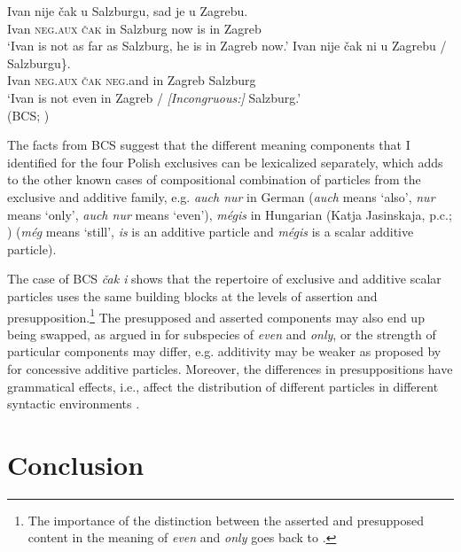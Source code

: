 \documentclass[output=paper,colorlinks,citecolor=brown]{langscibook}
\begin{document}
\ea\label{ex:tom:98}
\ea\label{ex:tom:98a} 
\gll Ivan nije čak u Salzburgu, sad je u Zagrebu.\\     
Ivan \textsc{neg.aux} \textsc{čak} in Salzburg now is in Zagreb\\
\glt `Ivan is not as far as Salzburg, he is in Zagreb now.’
\ex\label{ex:tom:98b}    
\gll Ivan nije čak ni u \minsp{\{} Zagrebu / \minsp{\#} Salzburgu\}.\\
Ivan \textsc{neg.aux} \textsc{čak} \textsc{neg}.and in {} Zagreb {} {} Salzburg\\
\glt `Ivan is not even in Zagreb / \textit{[Incongruous:]} Salzburg.’\\\hfill(BCS; \cite[(28--29)]{jasinskajatomaszewicz16})
\z 
\z 

\noindent The facts from BCS %
suggest that the different meaning components that I identified for the four Polish exclusives can be lexicalized separately, which adds to the other known cases of compositional combination of particles from the exclusive and additive family, e.g. \textit{auch nur} in German \citep{guerzoni03} (\textit{auch} means `also', \textit{nur} means `only', \textit{auch nur} means `even'), \textit{mégis} in Hungarian (Katja Jasinskaja, p.c.; \citealt{csirmazslade20}) (\textit{még} means `still', \textit{is} is an additive particle and \textit{mégis}  is a scalar additive particle).


The case of BCS \textit{čak i} shows that the repertoire of exclusive and additive scalar particles uses the same building blocks at the levels of assertion and presupposition.\footnote{The importance of the distinction between the asserted and presupposed content in the meaning of \textit{even} and \textit{only} goes back to \citealt{horn69}.} The presupposed and asserted components may also end up being swapped, as argued in \citet{guerzoni03} for subspecies of \textit{even} and \textit{only}, or the strength of particular components may differ, e.g. additivity may be weaker as proposed by \citet{crnic11,crnic12} for concessive additive particles. Moreover, the differences in presuppositions have grammatical effects, i.e., affect the distribution of different particles in different syntactic environments \citep{giannakidou07}.

\section{Conclusion}
\label{sec:tom:7}
\end{document}

